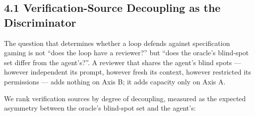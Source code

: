 \documentclass[
  11pt,
]{article}
\begin{document}
\subsection{4.1 Verification-Source Decoupling as the
Discriminator}\label{verification-source-decoupling-as-the-discriminator}

The question that determines whether a loop defends against
specification gaming is not ``does the loop have a reviewer?'' but
``does the oracle's blind-spot set differ from the agent's?''. A
reviewer that shares the agent's blind spots --- however independent its
prompt, however fresh its context, however restricted its permissions
--- adds nothing on Axis B; it adds capacity only on Axis A.

We rank verification sources by degree of decoupling, measured as the
expected asymmetry between the oracle's blind-spot set and the agent's:
\end{document}
